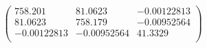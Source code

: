 \documentclass{article}
\begin{document}
\[\left(
\begin{array}{ccc}
 758.201 & 81.0623 & -0.00122813 \\
 81.0623 & 758.179 & -0.00952564 \\
 -0.00122813 & -0.00952564 & 41.3329 \\
\end{array}
\right)\]
\end{document}
